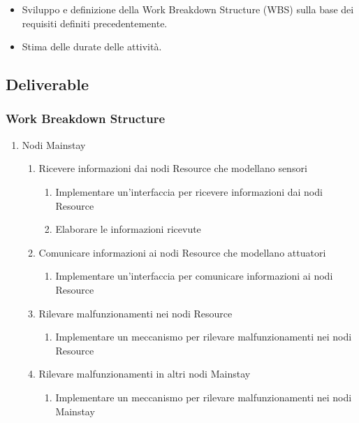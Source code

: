 \begin{itemize}
    \item Sviluppo e definizione della Work Breakdown Structure (WBS) sulla base dei requisiti definiti precedentemente.
    \item Stima delle durate delle attività.
\end{itemize}

\subsection{Deliverable}

\subsubsection{Work Breakdown Structure}

\begin{enumerate}
    \item Nodi Mainstay
          \begin{enumerate}
              \item Ricevere informazioni dai nodi Resource che modellano sensori
                    \begin{enumerate}
                        \item Implementare un'interfaccia per ricevere informazioni dai nodi Resource
                        \item Elaborare le informazioni ricevute
                    \end{enumerate}
              \item Comunicare informazioni ai nodi Resource che modellano attuatori
                    \begin{enumerate}
                        \item Implementare un'interfaccia per comunicare informazioni ai nodi Resource
                    \end{enumerate}
              \item Rilevare malfunzionamenti nei nodi Resource
                    \begin{enumerate}
                        \item Implementare un meccanismo per rilevare malfunzionamenti nei nodi Resource
                    \end{enumerate}
              \item Rilevare malfunzionamenti in altri nodi Mainstay
                    \begin{enumerate}
                        \item Implementare un meccanismo per rilevare malfunzionamenti nei nodi Mainstay

\end{enumerate}
\end{enumerate}
\end{enumerate}
